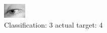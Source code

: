 \begin{figure}[h!]
\begin{center}
\includegraphics[width=0.60\columnwidth]{figures/ID2936_class_3_target_4.png}
\end{center}
\caption{ Classification: 3 actual target: 4}
\label{fig:ID2936_class_3_target_4}
\end{figure}
